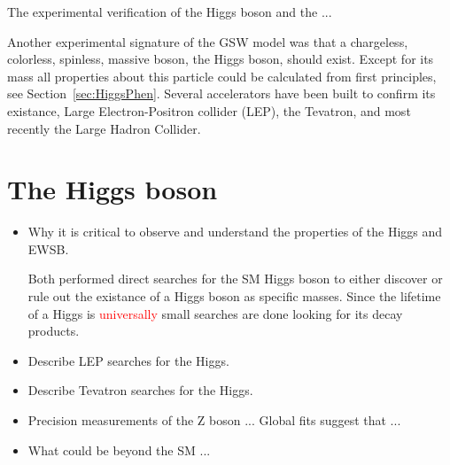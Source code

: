 The experimental verification of the Higgs boson and the ...

Another experimental signature of the GSW model was that a chargeless,
colorless, spinless, massive boson, the Higgs boson, should exist.  
Except for its mass all properties about this particle could be calculated
from first principles, see Section~\ref{sec:HiggsPhen}.  Several accelerators
have been built to confirm its existance, Large Electron-Positron collider (LEP), 
the Tevatron, and most recently the Large Hadron Collider.  

\section{The Higgs boson}
\label{sec:The Higgs boson}

\begin{itemize}
\item Why it is critical to observe and understand the properties of the Higgs
and EWSB.

Both performed direct searches for the SM Higgs boson to either 
discover or rule out the existance of a Higgs boson as specific
masses.  Since the lifetime of a Higgs is \textcolor{red}{universally}
small searches are done looking for its decay products.  

\item Describe LEP searches for the Higgs.

\item Describe Tevatron searches for the Higgs.

\item Precision measurements of the Z boson ...
Global fits suggest that ... 

\item What could be beyond the SM ...

\end{itemize}

